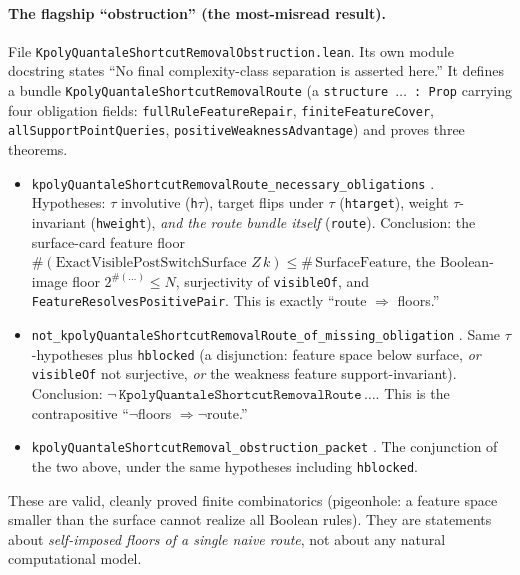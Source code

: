 \paragraph{The flagship ``obstruction'' (the most-misread result).}
File \texttt{KpolyQuantaleShortcutRemovalObstruction.lean}. Its own module
docstring states ``No final complexity-class separation is asserted here.'' It
defines a bundle \texttt{KpolyQuantaleShortcutRemovalRoute} (a
\texttt{structure $\dots$ : Prop} carrying four obligation fields:
\texttt{fullRuleFeatureRepair}, \texttt{finiteFeatureCover},
\texttt{allSupportPointQueries}, \texttt{positiveWeaknessAdvantage}) and proves
three theorems.

\begin{itemize}
  \item \texttt{kpolyQuantaleShortcutRemovalRoute\_necessary\_obligations}
  . Hypotheses: $\tau$ involutive
  (\texttt{h$\tau$}), target flips under $\tau$ (\texttt{htarget}), weight
  $\tau$-invariant (\texttt{hweight}), \emph{and the route bundle itself}
  (\texttt{route}). Conclusion: the surface-card feature floor
  $\#(\text{ExactVisiblePostSwitchSurface }Z\,k)\le \#\,\text{SurfaceFeature}$,
  the Boolean-image floor $2^{\#(\dots)}\le N$, surjectivity of
  \texttt{visibleOf}, and \texttt{FeatureResolvesPositivePair}. This is exactly
  ``route $\Rightarrow$ floors.''
  \item \texttt{not\_kpolyQuantaleShortcutRemovalRoute\_of\_missing\_obligation}
  . Same $\tau$-hypotheses plus \texttt{hblocked} (a
  disjunction: feature space below surface, \emph{or} \texttt{visibleOf} not
  surjective, \emph{or} the weakness feature support-invariant). Conclusion:
  $\lnot\,\texttt{KpolyQuantaleShortcutRemovalRoute}\,\dots$. This is the
  contrapositive ``$\lnot$floors $\Rightarrow \lnot$route.''
  \item \texttt{kpolyQuantaleShortcutRemoval\_obstruction\_packet}
  . The conjunction of the two above, under the same
  hypotheses including \texttt{hblocked}.
\end{itemize}

These are valid, cleanly proved finite combinatorics (pigeonhole: a feature
space smaller than the surface cannot realize all Boolean rules). They are
statements about \emph{self-imposed floors of a single naive route}, not about
any natural computational model.

